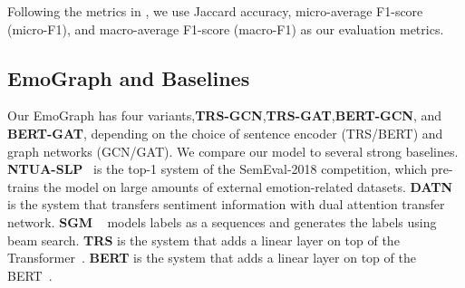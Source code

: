 \documentclass[11pt,a4paper]{article}
\begin{document}
Following the metrics in \citet{mohammad2018semeval}, we use Jaccard accuracy, micro-average F1-score (micro-F1), and macro-average F1-score (macro-F1) as our evaluation metrics.  






\subsection{EmoGraph and Baselines}
Our EmoGraph has four variants,\textbf{TRS-GCN},\textbf{TRS-GAT},\textbf{BERT-GCN}, and \textbf{BERT-GAT}, depending on the choice of sentence encoder (TRS/BERT) and graph networks (GCN/GAT). We compare our model to several strong baselines. \textbf{NTUA-SLP}~\cite{baziotis2018ntua} is the top-1 system of the SemEval-2018 competition, which pre-trains the model on large amounts of external emotion-related datasets. \textbf{DATN} ~\cite{yu2018improving} is the system that transfers sentiment information with dual attention transfer network.
\textbf{SGM} ~\cite{yang2018sgm} models labels as a sequences and generates the labels using beam search. \textbf{TRS} is the system that adds a linear layer on top of the Transformer~\cite{vaswani2017attention}. \textbf{BERT} is the  system that adds a linear layer on top of the BERT~\cite{devlin2019bert}.




\begin{table}[t]
\centering
{}
\caption{Comparisons among different systems on SemEval-2018 dataset.}
\label{table:compare_semeval}
\end{table}
\end{document}

